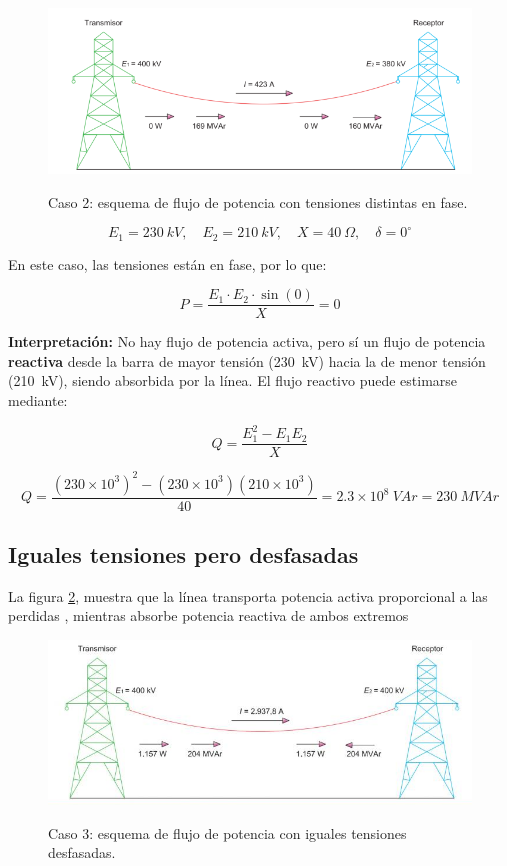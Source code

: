 \documentclass[a5paper]{book}%
\begin{document}
\begin{figure}[H]
	\centering
	\caption{Caso 2: esquema de flujo de potencia con tensiones distintas en
		fase.}
	\includegraphics[width=\linewidth]{tensiones_distintas_igual_fase}
	\label{fig:caso2}
\end{figure}

\[
E_{1} = 230~kV, \quad E_{2} = 210~kV, \quad X = 40~\Omega, \quad \delta = 0^\circ
\]

En este caso, las tensiones están en fase, por lo que:

\[
P = \dfrac{E_{1} \cdot E_{2} \cdot \sin(0)}{X} = 0
\]

\textbf{Interpretación:}  
No hay flujo de potencia activa, pero sí un flujo de potencia \textbf{reactiva} desde la barra de mayor tensión (230~kV) hacia la de menor tensión (210~kV), siendo absorbida por la línea.  
El flujo reactivo puede estimarse mediante:

\[
Q = \dfrac{E_{1}^{2} - E_{1}E_{2}}{X}
\]

\[
Q = \dfrac{(230 \times 10^{3})^{2} - (230 \times 10^{3})(210 \times 10^{3})}{40} = 2.3 \times 10^{8}~VAr = 230~MVAr
\]


\subsection{Iguales tensiones pero desfasadas}
La figura \ref{fig:caso3},  muestra que la línea transporta potencia activa proporcional a las perdidas , mientras absorbe potencia reactiva de ambos extremos

\begin{figure}[H]
	\centering
	\caption{Caso 3: esquema de flujo de potencia con iguales tensiones
		desfasadas.}
	\includegraphics[width=\linewidth]{tensionesigualesdesfasadas}
	\label{fig:caso3}
\end{figure}
\end{document}
